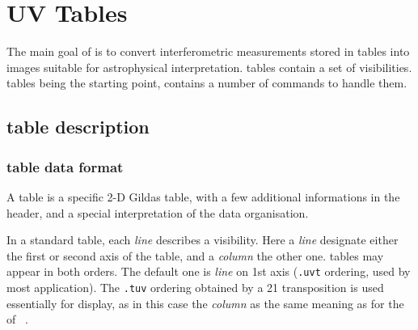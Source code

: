 \section{UV Tables}

The main goal of \imager{} is to convert interferometric measurements 
stored in \uv{} tables into images suitable for astrophysical interpretation. 
\uv{} tables contain a set of visibilities. \uv{} tables being the
starting point, \imager{} contains a number of commands to handle
them.


\subsection{\uv{} table description}

\subsubsection{\uv{} table data format}

A \uv{} table is a specific 2-D Gildas table, with a few additional
informations in the header, and a special interpretation of the data
organisation.

In a standard \uv{} table, each \textit{line} describes a visibility. 
Here a \textit{line} designate either the first or second axis of the 
table, and a \textit{column} the other one. \uv{} tables may appear in 
both orders. The default one is \textit{line} on 1st axis (\texttt{.uvt} 
ordering, used by most application). The \texttt{.tuv} ordering 
obtained by a 21 transposition is used essentially for display, as in 
this case the \textit{column} as the same meaning as for the 
 of \greg\ .

